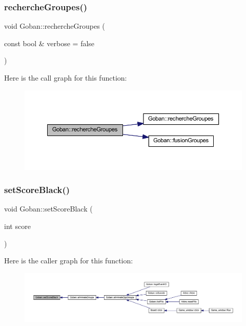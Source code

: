 \subsubsection{\texorpdfstring{recherche\+Groupes()}{rechercheGroupes()}\hspace{0.1cm}{\footnotesize\ttfamily [2/2]}}
{\footnotesize\ttfamily void Goban\+::recherche\+Groupes (\begin{DoxyParamCaption}\item[{const bool \&}]{verbose = {\ttfamily false} }\end{DoxyParamCaption})}

Here is the call graph for this function\+:
\nopagebreak
\begin{figure}[H]
\begin{center}
\leavevmode
\includegraphics[width=350pt]{class_goban_abd6663ff5c440bf6def073db02df83f0_cgraph}
\end{center}
\end{figure}
\mbox{\label{class_goban_a868b44b0c3ebec7ca88082ebe85a2960}} 
\subsubsection{\texorpdfstring{set\+Score\+Black()}{setScoreBlack()}}
{\footnotesize\ttfamily void Goban\+::set\+Score\+Black (\begin{DoxyParamCaption}\item[{int}]{score }\end{DoxyParamCaption})}

Here is the caller graph for this function\+:
\nopagebreak
\begin{figure}[H]
\begin{center}
\leavevmode
\includegraphics[width=350pt]{class_goban_a868b44b0c3ebec7ca88082ebe85a2960_icgraph}
\end{center}
\end{figure}
\mbox{\label{class_goban_a1d3ccccfb3f539e0271ee321686d9ef4}} 
